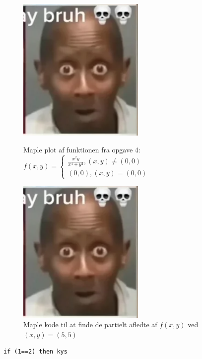\documentclass[a4paper,12pt]{article}
\begin{document}
\begin{figure} %
    \centering
    \includegraphics[scale=0.4]{bruh skull.png}
    \caption{Maple plot af funktionen fra opgave 4: $f(x,y)=\begin{cases}\frac{x^2 y}{x^4+y^2},(x,y)\neq(0,0)\\ (0,0),(x,y)=(0,0)\end{cases}$}


    \includegraphics[scale=0.4]{bruh skull.png}
    \caption{Maple kode til at finde de partielt afledte af $f(x,y)$ ved $(x,y)=(5,5)$}
\end{figure}

\begin{lstlisting}
if (1==2) then kys
\end{lstlisting}
\end{document}

